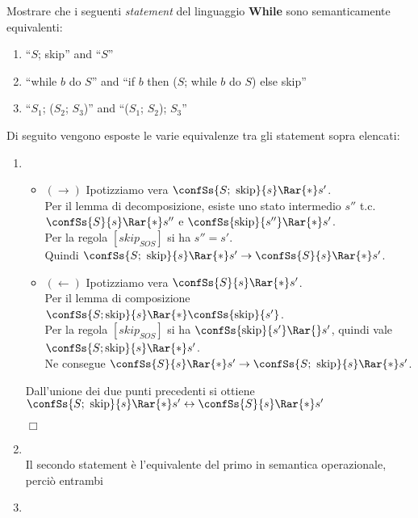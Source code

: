 {
  Mostrare che i seguenti \textit{statement} del linguaggio \textbf{While} sono
  semanticamente equivalenti:
  \begin{enumerate}[label=\alph*)]
    \item ``$S$; skip'' and ``$S$''
    \item ``while $b$ do $S$'' and
      ``if $b$ then ($S$; while $b$ do $S$) else skip''
    \item ``$S_1$; ($S_2$; $S_3$)'' and ``($S_1$; $S_2$); $S_3$''
  \end{enumerate}
}
{
  Di seguito vengono esposte le varie equivalenze tra gli statement sopra
  elencati:

  \begin{enumerate}[label=\alph*)]
    \item {}
    \begin{itemize}
      \item $(\rightarrow)$ Ipotizziamo vera
      $\confSs{S;\mbox{ skip}}{s} \Rar{*} s'$. \\
      Per il lemma di decomposizione, esiste uno stato intermedio $s''$ t.c.
      $\confSs{S}{s} \Rar{*} s''$ e $\confSs{\mbox{skip}}{s''} \Rar{*} s'$. \\
      Per la regola $[skip_{SOS}]$ si ha $s'' = s'$. \\
      Quindi $\confSs{S;\mbox{ skip}}{s} \Rar{*} s' \rightarrow \confSs{S}{s} 
      \Rar{*} s'$.

      \item $(\leftarrow)$ Ipotizziamo vera $\confSs{S}{s} \Rar{*} s'$. \\
      Per il lemma di composizione $\confSs{S; \mbox{skip}}{s} \Rar{*} 
      \confSs{\mbox{skip}}{s'}$. \\
      Per la regola $[skip_{SOS}]$ si ha $\confSs{\mbox{skip}}{s'} \Rar{} s'$,
      quindi vale $\confSs{S; \mbox{skip}}{s} \Rar{*} s'$. \\ 
      Ne consegue $ \confSs{S}{s} \Rar{*} s' \rightarrow 
         \confSs{S;\mbox{ skip}}{s} \Rar{*} s'$.     
    \end{itemize}
      Dall'unione dei due punti precedenti si ottiene 
      $\confSs{S;\mbox{ skip}}{s} \Rar{*} s' \leftrightarrow 
      \confSs{S}{s} \Rar{*} s'$
      \begin{flushright}
      $\Box$
      \end{flushright}
    \item {} \\
      Il secondo statement è
      l'equivalente del primo in semantica operazionale, perciò entrambi

    \item {} 
  \end{enumerate}
}
